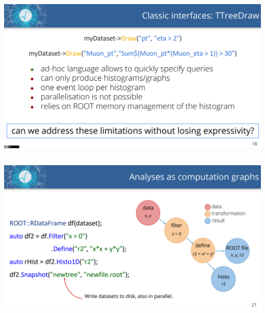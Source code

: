 \documentclass[aspectratio=169]{beamer}
\begin{document}
\begin{frame}{}
\vspace{-0.05 cm}
\begin{columns}
\includegraphics[width=\linewidth]{slides-12.png}
\end{columns}
\end{frame}

\begin{frame}{}
\vspace{-0.05 cm}
\begin{columns}
\includegraphics[width=\linewidth]{slides-13.png}
\end{columns}
\end{frame}
\end{document}

